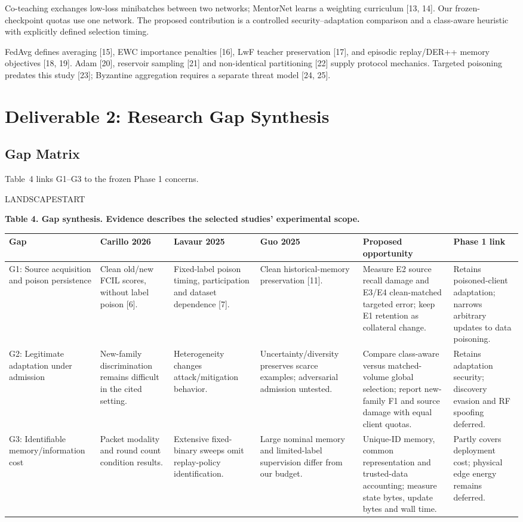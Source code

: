 \documentclass[10pt,a4paper]{article}
\begin{document}
Co-teaching exchanges low-loss minibatches between two networks; MentorNet learns a weighting curriculum [13, 14]. Our frozen-checkpoint quotas use one network. The proposed contribution is a controlled security--adaptation comparison and a class-aware heuristic with explicitly defined selection timing.

FedAvg defines averaging [15], EWC importance penalties [16], LwF teacher preservation [17], and episodic replay/DER++ memory objectives [18, 19]. Adam [20], reservoir sampling [21] and non-identical partitioning [22] supply protocol mechanics. Targeted poisoning predates this study [23]; Byzantine aggregation requires a separate threat model [24, 25].

\section{Deliverable 2: Research Gap Synthesis}
\subsection{Gap Matrix}
Table~4 links G1--G3 to the frozen Phase 1 concerns.


\par LANDSCAPESTART



\centering\footnotesize
\par\textbf{Table 4. Gap synthesis. Evidence describes the selected studies' experimental scope.}\par


\begin{longtable}{p{2.3cm}l l l l p{2.4cm}}
\toprule
Gap & Carillo 2026 & Lavaur 2025 & Guo 2025 & Proposed opportunity & Phase 1 link\\
\midrule
G1: Source acquisition and poison persistence
& Clean old/new FCIL scores, without label poison [6].
& Fixed-label poison timing, participation and dataset dependence [7].
& Clean historical-memory preservation [11].
& Measure E2 source recall damage and E3/E4 clean-matched targeted error; keep E1 retention as collateral change.
& Retains poisoned-client adaptation; narrows arbitrary updates to data poisoning.\\[5pt]
G2: Legitimate adaptation under admission
& New-family discrimination remains difficult in the cited setting.
& Heterogeneity changes attack/mitigation behavior.
& Uncertainty/diversity preserves scarce examples; adversarial admission untested.
& Compare class-aware versus matched-volume global selection; report new-family F1 and source damage with equal client quotas.
& Retains adaptation security; discovery evasion and RF spoofing deferred.\\[5pt]
G3: Identifiable memory/information cost
& Packet modality and round count condition results.
& Extensive fixed-binary sweeps omit replay-policy identification.
& Large nominal memory and limited-label supervision differ from our budget.
& Unique-ID memory, common representation and trusted-data accounting; measure state bytes, update bytes and wall time.
& Partly covers deployment cost; physical edge energy remains deferred.\\
\bottomrule
\end{longtable}
\end{document}

